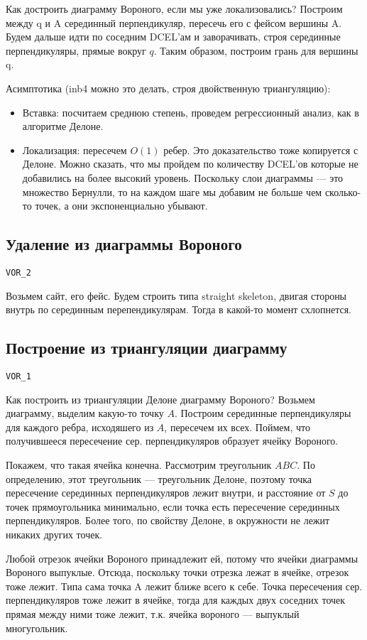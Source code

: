 \documentclass[11pt]{article}
\begin{document}
Как достроить диаграмму Вороного, если мы уже локализовались?
Построим между q и A серединный перпендикуляр, пересечь его с фейсом
вершины A. Будем дальше идти по соседним DCEL'ам и заворачивать,
строя серединные перпендикуляры, прямые вокруг \(q\). Таким образом,
построим грань для вершины q.

Асимптотика (inb4 можно это делать, строя двойственную триангуляцию):
\begin{itemize}
\item Вставка: посчитаем среднюю степень, проведем регрессионный анализ,
как в алгоритме Делоне.
\item Локализация: пересечем \(O(1)\) ребер. Это доказательство тоже
копируется с Делоне. Можно сказать, что мы пройдем по количеству
DCEL'ов которые не добавились на более высокий уровень. Поскольку
слои диаграммы --- это множество Бернулли, то на каждом шаге мы
добавим не больше чем сколько-то точек, а они экспоненциально
убывают.
\end{itemize}
\subsection{Удаление из диаграммы Вороного}
\label{sec:orgheadline53}
\texttt{VOR\_2}

Возьмем сайт, его фейс. Будем строить типа straight skeleton,
двигая стороны внутрь по серединным перепендикулярам. Тогда в
какой-то момент схлопнется.
\subsection{Построение из триангуляции диаграмму}
\label{sec:orgheadline54}
\texttt{VOR\_1}

Как построить из триангуляции Делоне диаграмму Вороного?  Возьмем
диаграмму, выделим какую-то точку \(A\). Построим серединные
перпендикуляры для каждого ребра, исходяшего из \(A\), пересечем их
всех. Поймем, что получившееся пересечение сер. перпендикуляров
образует ячейку Вороного.

Покажем, что такая ячейка конечна. Рассмотрим треугольник \(ABC\). По
определению, этот треугольник --- треугольник Делоне, поэтому точка
пересечение серединных перпендикуляров лежит внутри, и расстояние
от \(S\) до точек прямоугольника минимально, если точка есть
пересечение серединных перпендикуляров. Более того, по свойству
Делоне, в окружности не лежит никаких других точек.

Любой отрезок ячейки Вороного принадлежит ей, потому что ячейки
диаграммы Вороного выпуклые. Отсюда, поскольку точки отрезка лежат в
ячейке, отрезок тоже лежит. Типа сама точка A лежит ближе всего к
себе. Точка пересечения сер. перпендикуляров тоже лежит в ячейке,
тогда для каждых двух соседних точек прямая между ними тоже лежит,
т.к. ячейка вороного --- выпуклый многугольник.
\end{document}
